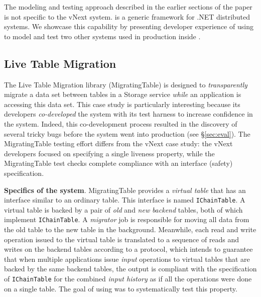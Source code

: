 The modeling and testing approach described in the earlier sections of the paper is not specific to the vNext system. \psharp is a generic framework for .NET distributed systems. We showcase this capability by presenting developer experience of using \psharp to model and test two other systems used in production inside \Microsoft.

\subsection{Live Table Migration}
\label{sec:cases:migration}

The Live Table Migration library (MigratingTable) is designed to \emph{transparently} migrate a data set between tables in a
\Azure Storage service \emph{while} an application is accessing this data set. This case study is particularly interesting because its developers \emph{co-developed} the system with its \psharp test harness to increase confidence in the system. Indeed, this co-development process resulted in the discovery of several tricky bugs before the system went into production (see \S\ref{sec:eval}). The MigratingTable testing effort differs from the vNext case study: the vNext developers focused on specifying a single liveness property, while the MigratingTable test checks complete compliance with an interface (safety) specification.

\textbf{Specifics of the system}.
MigratingTable provides a \emph{virtual table} that has an interface similar to an ordinary \Azure table. This interface is named \texttt{IChainTable}. A virtual table is backed by a pair of \emph{old} and \emph{new} \emph{backend} tables, both of which implement \texttt{IChainTable}. A \emph{migrator} job is responsible for moving all data from the old table to the new table in the background. Meanwhile, each read and write operation issued to the virtual table is translated to a sequence of reads and writes on the backend tables according to a protocol, which intends to guarantee that when multiple applications issue \emph{input} operations to virtual tables that are backed by the same backend tables, the output is compliant with the specification of \texttt{IChainTable} for the combined \emph{input history} as if all the operations were done on a single table. The goal of using \psharp was to systematically test this property.

